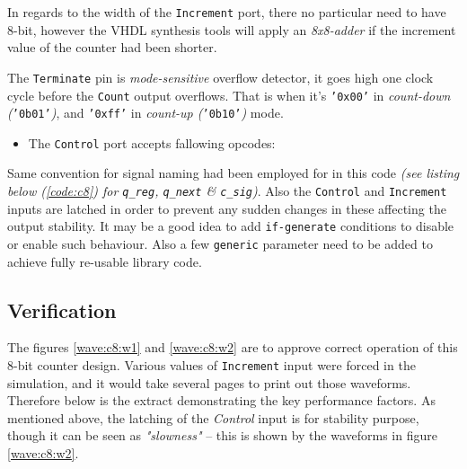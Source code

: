 \documentclass[10pt,a4paper]{report}
\begin{document}
 In regards to the width of the \texttt{Increment}
 port, there no particular need to have 8-bit, however
 the VHDL synthesis tools will apply an \emph{8x8-adder}
 if the increment value of the counter had been shorter.

 The \texttt{Terminate} pin is \emph{mode-sensitive}
 overflow detector, it goes high one clock cycle before
 the \texttt{Count} output overflows.
 That is when it's \texttt{'0x00'} in
 \emph{count-down (}\texttt{'0b01'}\emph{)},
 and \texttt{'0xff'} in
 \emph{count-up (}\texttt{'0b10'}\emph{)} mode.

 \begin{itemize}
 \item The \texttt{Control} port accepts fallowing opcodes:
 \end{itemize}

 Same convention for signal naming had been employed
 for in this code \emph{(see listing below (\ref{code:c8})
 for \texttt{q\_reg}, \texttt{q\_next} \& \texttt{c\_sig})}.
 Also the \texttt{Control} and \texttt{Increment} inputs
 are latched in order to prevent any sudden changes in
 these affecting the output stability. It may be a good
 idea to add \texttt{if-generate} conditions to disable
 or enable such behaviour. Also a few \texttt{generic}
 parameter need to be added to achieve fully re-usable
 library code.

\subsection{Verification}

 The figures \ref{wave:c8:w1} and \ref{wave:c8:w2} are
 to approve correct operation of this 8-bit counter
 design. Various values of \texttt{Increment} input
 were forced in the simulation, and it would take
 several pages to print out those waveforms. Therefore
 below is the extract demonstrating the key performance
 factors. As mentioned above, the latching of the
 \emph{Control} input is for stability purpose, though
 it can be seen as \emph{"slowness"} -- this is shown
 by the waveforms in figure \ref{wave:c8:w2}.
 
\end{document}
